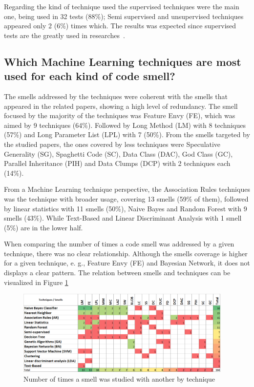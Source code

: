 Regarding the kind of technique used the supervised techniques were the main one, being used in 32 tests (88\%); Semi supervised and unsupervised techniques appeared only 2 (6\%) times which. The results was expected since supervised tests are the greatly used in researches~\citep{kotsiantis2007supervised}.

\subsection{Which Machine Learning techniques are most used for each kind of code smell?}

The smells addressed by the techniques were coherent with the smells that appeared in the related papers, showing a high level of redundancy. The smell focused by the majority of the techniques was Feature Envy (FE), which was aimed by 9 techniques (64\%). Followed by Long Method (LM) with 8 techniques (57\%) and Long Parameter List (LPL) with 7 (50\%). From the smells targeted by the studied papers, the ones covered by less techniques were Speculative Generality (SG), Spaghetti Code (SC), Data Class (DAC),  God Class (GC), Parallel Inheritance (PIH) and Data Clumps (DCP) with 2 techniques each (14\%).

From a Machine Learning technique perspective, the Association Rules techniques was the technique with broader usage, covering 13 smells (59\% of them), followed by linear statistics with 11 smells (50\%), Naive Bayes and Random Forest with 9 smells (43\%). While Text-Based and Linear Discriminant Analysis with 1 smell (5\%) are in the lower half.


When comparing the number of times a code smell was addressed by a given technique, there was no clear relationship. Although the smells coverage is higher for a given technique, e. g., Feature Envy (FE) and Bayesian Network, it does not displays a clear pattern. The relation between smells and techniques can be visualized in Figure \ref{fig:smellsXMLTechniques}

\begin{figure}[!ht] 
    \centering
	\caption{Number of times a smell was studied with another by technique}
	\label{fig:smellsXMLTechniques}
	\includegraphics[width=0.95\textwidth]{imagens/smellsXMLTechniques.png}
\end{figure}

